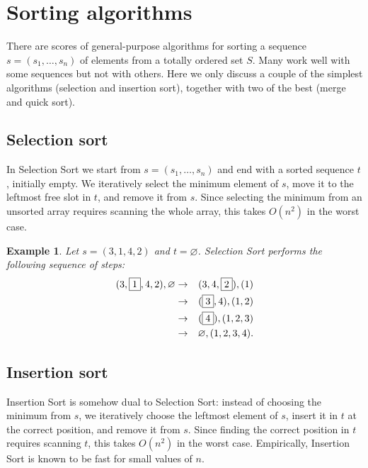 \documentclass[a4paper]{book}
\theoremstyle{changebreak}                %
\newtheorem{eg}[result]{Example}
\begin{document}
\section{Sorting algorithms}
There are scores of general-purpose
algorithms for sorting a
sequence $s=(s_1,\ldots,s_n)$ of elements from a
totally ordered set $S$. Many work well
with some sequences but not with others. Here we only discuss a couple
of the simplest algorithms (selection and
insertion sort), together with two of the best
(merge and quick sort).

\subsection{Selection sort}
In {\sc Selection Sort} we start from $s=(s_1,\ldots,s_n)$
and end with a sorted sequence $t$, initially empty. We iteratively
select the minimum element of $s$, move it to
the leftmost free slot in $t$, and remove it
from $s$. Since selecting the minimum from an unsorted
array requires scanning the whole
array, this takes $O(n^2)$ in the worst case.

\begin{eg}
Let $s=(3,1,4,2)$ and $t=\varnothing$. {\sc Selection Sort} performs the
following sequence of steps:
\begin{eqnarray*}
(3,\fbox{$1$},4,2),\varnothing &\to& (3,4,\fbox{$2$}),(1) \\
                               &\to& (\fbox{$3$},4),(1,2) \\
                               &\to& (\fbox{$4$}),(1,2,3) \\
                               &\to& \varnothing,(1,2,3,4).
\end{eqnarray*}
\end{eg}

\subsection{Insertion sort}
{\sc Insertion Sort} is somehow dual to {\sc Selection
  Sort}: instead of choosing the minimum from $s$, we
iteratively choose the leftmost element of
$s$, insert it in $t$ at the correct position,
and remove it from $s$. Since finding the correct position in $t$
requires scanning $t$, this takes $O(n^2)$ in the worst
case. Empirically, {\sc Insertion Sort} is known to be fast for small
values of $n$.
\end{document}

